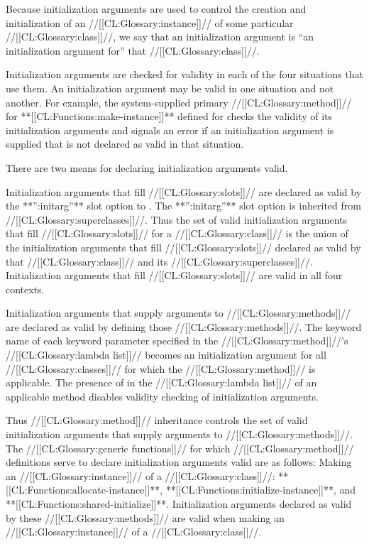 Because initialization arguments are used to control the creation and
initialization of an //[[CL:Glossary:instance]]// of some particular //[[CL:Glossary:class]]//,
we say that an initialization argument is
``an initialization argument for'' that //[[CL:Glossary:class]]//.

\endsubsection%


Initialization arguments are checked for validity in each of the four
situations that use them.  An initialization argument may be valid in
one situation and not another. For example, the system-supplied     
primary //[[CL:Glossary:method]]// for **[[CL:Functions:make-instance]]** defined for 
 checks the validity of its initialization arguments
and signals an error if an initialization argument is supplied that is
not declared as valid in that situation.


There are two means for declaring initialization arguments valid.

\beginlist

\itemitem{\bull}
Initialization arguments that fill //[[CL:Glossary:slots]]// are declared as valid
by the **'':initarg''** slot option to .  The
**'':initarg''** slot option is inherited from //[[CL:Glossary:superclasses]]//.  Thus
the set of valid initialization arguments that fill //[[CL:Glossary:slots]]// for a
//[[CL:Glossary:class]]// is the union of the initialization arguments that fill
//[[CL:Glossary:slots]]// declared as valid by that //[[CL:Glossary:class]]// and its
//[[CL:Glossary:superclasses]]//.  Initialization arguments that fill //[[CL:Glossary:slots]]//
are valid in all four contexts.

\itemitem{\bull}
Initialization arguments that supply arguments to //[[CL:Glossary:methods]]// are
declared as valid by defining those //[[CL:Glossary:methods]]//.  The keyword name of
each keyword parameter specified in the //[[CL:Glossary:method]]//'s 
//[[CL:Glossary:lambda list]]// becomes an initialization argument for all //[[CL:Glossary:classes]]// 
for which the //[[CL:Glossary:method]]// is applicable.
The presence of {\allowotherkeys} in the
//[[CL:Glossary:lambda list]]// of an applicable method disables validity checking of 
initialization arguments.

Thus //[[CL:Glossary:method]]// inheritance
controls the set of valid initialization arguments that supply arguments
to //[[CL:Glossary:methods]]//.  The //[[CL:Glossary:generic functions]]// for which //[[CL:Glossary:method]]//
definitions serve to declare initialization arguments valid are as
follows:
\beginlist                                              
\itemitem{--}
Making an //[[CL:Glossary:instance]]// of a //[[CL:Glossary:class]]//:
**[[CL:Functions:allocate-instance]]**, **[[CL:Functions:initialize-instance]]**, and
**[[CL:Functions:shared-initialize]]**.  Initialization arguments declared as valid
by these //[[CL:Glossary:methods]]// are valid when making 
an //[[CL:Glossary:instance]]// of a //[[CL:Glossary:class]]//.

